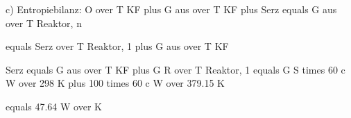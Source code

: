 c) Entropiebilanz: O over T KF plus G aus over T KF plus Serz equals G aus over T Reaktor, n

equals Serz over T Reaktor, 1 plus G aus over T KF

Serz equals G aus over T KF plus G R over T Reaktor, 1 equals G S times 60 c W over 298 K plus 100 times 60 c W over 379.15 K

equals 47.64 W over K